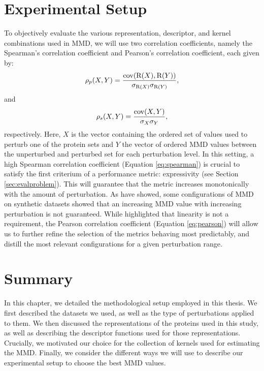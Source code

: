 \section{Experimental Setup}

To objectively evaluate the various representation, descriptor, and kernel
combinations used in MMD, we will use two correlation coefficients, namely the
Spearman's correlation coefficient and Pearson's correlation coefficient, each
given by:
\begin{equation}
  \label{eq:spearman} \rho_p(X,Y) = {\mathrm{cov}(\mathrm{R}(X), \mathrm{R}(Y)) \over
\sigma_{\mathrm{R}(X)}\sigma_{\mathrm{R}(Y)}},
\end{equation} and
\begin{equation}
  \label{eq:pearson} \rho_s(X,Y) = {\mathrm{cov}(X, Y)\over \sigma_X\sigma_Y},
\end{equation}
respectively. Here, $X$ is the vector containing the ordered set of values used
to perturb one of the protein sets and $Y$ the vector of ordered MMD values
between the unperturbed and perturbed set for each perturbation level. In this
setting, a high Spearman correlation coefficient (Equation \ref{eq:spearman}) is
crucial to satisfy the first criterium of a performance metric: expressivity
(see Section \ref{sec:evalproblem}). This will guarantee that the metric
increases monotonically with the amount of perturbation. As
\cite{o2021evaluation} have showed, some configurations of MMD on synthetic
datasets showed that an increasing MMD value with increasing perturbation is not
guaranteed. While \cite{thompson2022evaluation} highlighted that linearity is
not a requirement, the Pearson correlation coefficient (Equation
\ref{eq:pearson}) will allow us to further refine the selection of the metrics
behaving most predictably, and distill the most relevant configurations for a
given perturbation range.


\section{Summary}

In this chapter, we detailed the methodological setup employed in this thesis.
We first described the datasets we used, as well as the type of perturbations
applied to them. We then discussed the representations of the proteins used in
this study, as well as describing the descriptor functions used for those
representations. Crucially, we motivated our choice for the collection of
kernels used for estimating the MMD. Finally, we consider the different ways we
will use to describe our experimental setup to choose the best MMD values.
